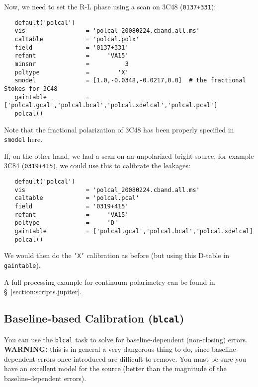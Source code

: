 Now, we need to set the R-L phase using a scan on
3C48 ({\tt 0137+331}):
\small
\begin{verbatim}
   default('polcal')
   vis                 = 'polcal_20080224.cband.all.ms'
   caltable            = 'polcal.polx'
   field               = '0137+331'
   refant              =     'VA15'        
   minsnr              =          3        
   poltype             =        'X'
   smodel              = [1.0,-0.0348,-0.0217,0.0]  # the fractional Stokes for 3C48
   gaintable           = ['polcal.gcal','polcal.bcal','polcal.xdelcal','polcal.pcal']
   polcal()
\end{verbatim}
\normalsize

Note that the fractional polarization of 3C48 has been properly specified 
in {\tt smodel} here.


If, on the other hand, we had a scan on an unpolarized bright source,
for example 3C84 ({\tt 0319+415}), we could use this to calibrate the
leakages:
\small
\begin{verbatim}
   default('polcal')
   vis                 = 'polcal_20080224.cband.all.ms'
   caltable            = 'polcal.pcal'
   field               = '0319+415'
   refant              =     'VA15'        
   poltype             =     'D'        
   gaintable           = ['polcal.gcal','polcal.bcal','polcal.xdelcal]
   polcal()
\end{verbatim}
\normalsize
We would then do the {\tt 'X'} calibration as before (but using this
D-table in {\tt gaintable}).

A full processing example for continuum polarimetry can be found
in \S~\ref{section:scripts.jupiter}.

\subsection{Baseline-based Calibration ({\tt blcal})}
\label{section:cal.solve.blcal}

You can use the {\tt blcal} task to solve for baseline-dependent
(non-closing) errors.  {\bf WARNING:} this is in general a very dangerous
thing to do, since baseline-dependent errors once introduced are
difficult to remove.  You must be sure you have an excellent model
for the source (better than the magnitude of the baseline-dependent
errors).

